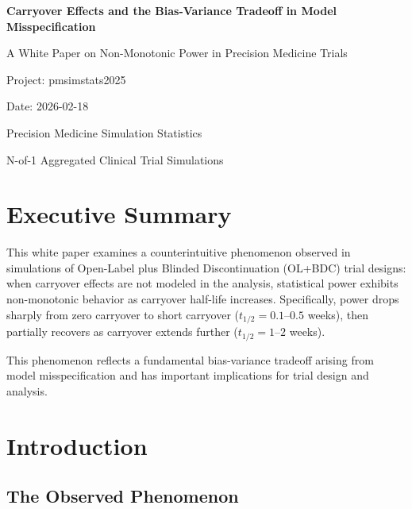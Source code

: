 \documentclass[11pt,a4paper]{article}
\begin{document}
\begin{titlepage}
\centering
\vspace*{2cm}
{\Huge\bfseries Carryover Effects and the Bias-Variance Tradeoff in Model Misspecification\par}
\vspace{1cm}
{\Large A White Paper on Non-Monotonic Power in Precision Medicine Trials\par}
\vspace{2cm}
{\large Project: pmsimstats2025\par}
\vspace{0.5cm}
{\large Date: 2026-02-18\par}
\vfill
{\normalsize Precision Medicine Simulation Statistics\par}
{\normalsize N-of-1 Aggregated Clinical Trial Simulations\par}
\end{titlepage}

\tableofcontents
\newpage

\section*{Executive Summary}

This white paper examines a counterintuitive phenomenon observed in simulations of
Open-Label plus Blinded Discontinuation (OL+BDC) trial designs: when carryover
effects are not modeled in the analysis, statistical power exhibits non-monotonic
behavior as carryover half-life increases. Specifically, power drops sharply from
zero carryover to short carryover ($t_{1/2} = 0.1$--$0.5$ weeks), then partially recovers
as carryover extends further ($t_{1/2} = 1$--$2$ weeks).

This phenomenon reflects a fundamental bias-variance tradeoff arising from model
misspecification and has important implications for trial design and analysis.

\newpage

\section{Introduction}

\subsection{The Observed Phenomenon}
\end{document}
